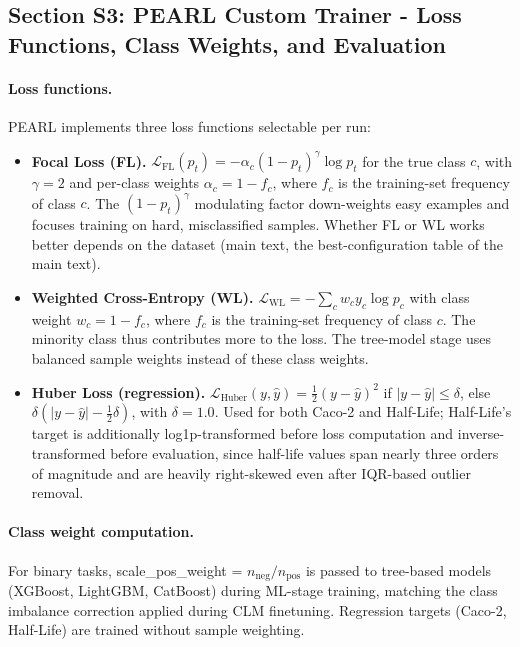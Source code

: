 \documentclass[9pt,a4paper]{article}
\begin{document}
\subsection*{Section S3: PEARL Custom Trainer - Loss Functions, Class Weights,
and Evaluation}

\paragraph{Loss functions.}
PEARL implements three loss functions selectable per run:

\begin{itemize}[leftmargin=2em]
\item \textbf{Focal Loss (FL).}
  $\mathcal{L}_\text{FL}(p_t) = -\alpha_c (1 - p_t)^\gamma \log p_t$
  for the true class $c$, with $\gamma = 2$ and per-class weights $\alpha_c = 1 - f_c$, where $f_c$ is the training-set frequency of class $c$.
  The $(1 - p_t)^\gamma$ modulating factor down-weights easy examples and focuses
  training on hard, misclassified samples. Whether FL or WL works better depends on the dataset (main text, the best-configuration table of the main text).

\item \textbf{Weighted Cross-Entropy (WL).}
  $\mathcal{L}_\text{WL} = -\sum_c w_c y_c \log p_c$
  with class weight $w_c = 1 - f_c$, where $f_c$ is the training-set frequency of class $c$.
  The minority class thus contributes more to the loss. The tree-model stage uses balanced sample weights instead of these class weights.

\item \textbf{Huber Loss (regression).}
  $\mathcal{L}_\text{Huber}(y,\hat y) = \tfrac{1}{2}(y-\hat y)^2$ if $|y-\hat y|\le\delta$,
  else $\delta(|y-\hat y|-\tfrac12\delta)$, with $\delta=1.0$. Used for both Caco-2
  and Half-Life; Half-Life's target is additionally log1p-transformed before loss
  computation and inverse-transformed before evaluation, since half-life values
  span nearly three orders of magnitude and are heavily right-skewed even after
  IQR-based outlier removal.
\end{itemize}

\paragraph{Class weight computation.}
For binary tasks, scale\_pos\_weight = $n_\text{neg} / n_\text{pos}$ is passed to
tree-based models (XGBoost, LightGBM, CatBoost) during ML-stage training,
matching the class imbalance correction applied during CLM finetuning. Regression
targets (Caco-2, Half-Life) are trained without sample weighting.
\end{document}
